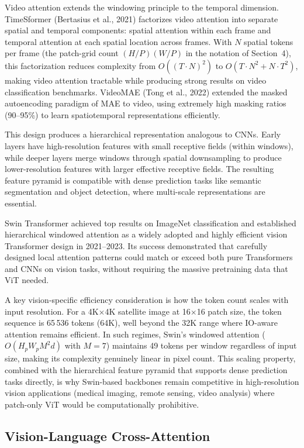 \documentclass[10pt,twocolumn]{article}
\begin{document}
Video attention extends the windowing principle to the temporal dimension. TimeSformer (Bertasius et al., 2021) factorizes video attention into separate spatial and temporal components: spatial attention within each frame and temporal attention at each spatial location across frames. With $N$ spatial tokens per frame (the patch-grid count $(H/P)(W/P)$ in the notation of Section~4), this factorization reduces complexity from $O((T \cdot N)^2)$ to $O(T \cdot N^2 + N \cdot T^2)$, making video attention tractable while producing strong results on video classification benchmarks. VideoMAE (Tong et al., 2022) extended the masked autoencoding paradigm of MAE to video, using extremely high masking ratios (90--95\%) to learn spatiotemporal representations efficiently.

This design produces a hierarchical representation analogous to CNNs. Early layers have high-resolution features with small receptive fields (within windows), while deeper layers merge windows through spatial downsampling to produce lower-resolution features with larger effective receptive fields. The resulting feature pyramid is compatible with dense prediction tasks like semantic segmentation and object detection, where multi-scale representations are essential.

Swin Transformer achieved top results on ImageNet classification and established hierarchical windowed attention as a widely adopted and highly efficient vision Transformer design in 2021--2023. Its success demonstrated that carefully designed local attention patterns could match or exceed both pure Transformers and CNNs on vision tasks, without requiring the massive pretraining data that ViT needed.

A key vision-specific efficiency consideration is how the token count scales with input resolution. For a 4K$\times$4K satellite image at 16$\times$16 patch size, the token sequence is 65\,536 tokens (64K), well beyond the 32K range where IO-aware attention remains efficient. In such regimes, Swin's windowed attention ($O(H_pW_pM^2d)$ with $M=7$) maintains 49 tokens per window regardless of input size, making its complexity genuinely linear in pixel count. This scaling property, combined with the hierarchical feature pyramid that supports dense prediction tasks directly, is why Swin-based backbones remain competitive in high-resolution vision applications (medical imaging, remote sensing, video analysis) where patch-only ViT would be computationally prohibitive.

\subsection{Vision-Language Cross-Attention}\label{vision-language-cross-attention}
\end{document}
